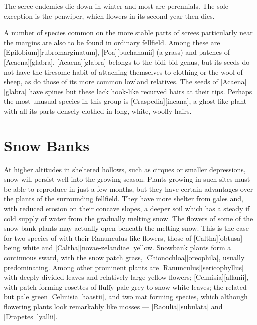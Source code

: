 The scree endemics die down in winter and most are perennials.
The sole exception is the penwiper, which flowers in its second year then dies.

A number of species common on the more stable parts of screes particularly near the margins are also to be found in ordinary fellfield.
Among these are [Epilobium][rubromarginatum], [Poa][buchananii] (a grass) and patches of [Acaena][glabra]. [Acaena][glabra] belongs to the bidi-bid genus, but its seeds do not have the tiresome habit of attaching themselves to clothing or the wool of sheep, as do those of its more common lowland relatives.
The seeds of [Acaena][glabra] have spines but these lack hook-like recurved hairs at their tips.
Perhaps the most unusual species in this group is [Craspedia][incana], a ghost-like plant with all its parts densely clothed in long, white, woolly hairs.

\section{Snow Banks}

At higher altitudes in sheltered hollows, such as cirques or smaller depressions, snow will persist well into the growing season.
Plants growing in such sites must be able to reproduce in just a few months, but they have certain advantages over the plants of the surrounding fellfield.
They have more shelter from gales and, with reduced erosion on their concave slopes, a deeper soil which has a steady if cold supply of water from the gradually melting snow.
The flowers of some of the snow bank plants may actually open beneath the melting snow.
This is the case for two species of  with their Ranunculus-like flowers, those of [Caltha][obtusa]  being white and [Caltha][novae-zelandiae] yellow.
Snowbank plants form a continuous sward, with the snow patch grass, [Chionochloa][oreophila], usually predominating.
Among other prominent plants are [Ranunculus][sericophyllus] with deeply divided leaves and relatively large yellow flowers; [Celmisia][allanii], with patch forming rosettes of fluffy pale grey to snow white leaves; the related but pale green [Celmisia][haastii], and two mat forming species, which although flowering plants look remarkably like mosses --- [Raoulia][subulata] and [Drapetes][lyallii].

